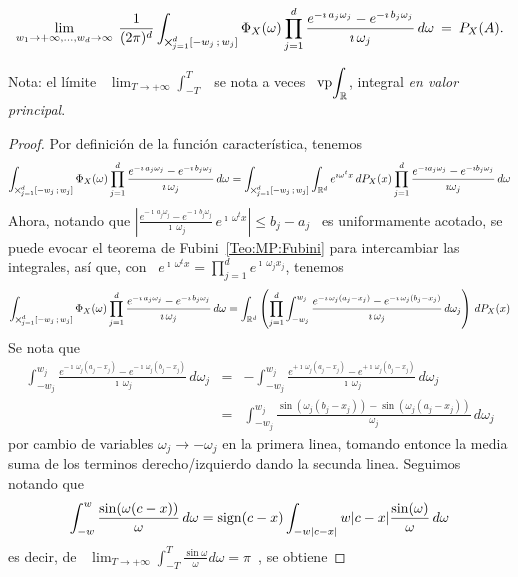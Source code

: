 {\begin{teorema}
  \[
  \lim_{w_1  \to   +\infty,\ldots,  w_d  \to  \infty}   \:  \frac{1}{(2  \pi)^d}
  \int_{\operatorname*{\bigtimes}_{j=1}^d   [-w_j  \, ; \,  w_j]}   \Phi_X(\omega)  \prod_{j   =  1}^d
  \frac{e^{- \imath \,  a_j \omega_j} - e^{- \imath  \, b_j \omega_j}}{\imath \,
    \omega_j} \, d\omega \: = \: P_X(A).
  \]
\end{teorema}
%
Nota: el l\'imite \ $\displaystyle\lim_{T  \to +\infty} \int_{-T}^T$ \ se nota a
veces \ $\displaystyle \operatorname{vp} \!  \int_{\mathbb{R}}$, integral {\it en valor
  principal}.
%
\begin{proof}
  Por definici\'on de la funci\'on caracter\'istica, tenemos
  \[
  \int_{\operatorname*{\bigtimes}_{j=1}^d   [-w_j  \, ; \,  w_j]} \Phi_X(\omega)  \prod_{j = 1}^d  \frac{e^{- \imath  \, a_j
      \omega_j} - e^{- \imath \, b_j \omega_j}}{\imath \, \omega_j} \, d\omega =
  \int_{\operatorname*{\bigtimes}_{j=1}^d   [-w_j  \, ; \,  w_j]} \int_{\mathbb{R}^d} e^{\imath  \omega^t x} \, dP_X(x) \prod_{j =
    1}^d  \frac{e^{- \imath a_j  \omega_j} -  e^{- \imath  b_j \omega_j}}{\imath
    \omega_j} \, d\omega
  \]
  Ahora, notando que $\left| \frac{e^{- \imath \, a_j \omega_j} - e^{- \imath \,
        b_j \omega_j}}{\imath  \, \omega_j} \, e^{\imath \,  \omega^t x} \right|
  \le  b_j - a_j$  \ es  uniformamente acotado,  se puede  evocar el  teorema de
  Fubini~\ref{Teo:MP:Fubini} para intercambiar las  integrales, as\'i que, con \
  $e^{\imath \, \omega^t x} = \prod_{j=1}^d e^{\imath \, \omega_j x_j}$, tenemos
  \[
  \int_{\operatorname*{\bigtimes}_{j=1}^d   [-w_j  \, ; \,  w_j]}   \Phi_X(\omega)  \prod_{j   =  1}^d
  \frac{e^{- \imath \,  a_j \omega_j} - e^{- \imath  \, b_j \omega_j}}{\imath \,
    \omega_j} \, d\omega = \int_{\mathbb{R}^d} \left( \prod_{j=1}^d \int_{-w_j}^{w_j}
    \frac{e^{- \imath \, \omega_j (a_j -  x_j)} - e^{- \imath \, \omega_j (b_j -
        x_j)}}{\imath \, \omega_j} \, d\omega_j \right) \, dP_X(x)
  \]
  Se nota que
  \begin{eqnarray*}
  \int_{-w_j}^{w_j} \frac{e^{- \imath \, \omega_j (a_j - x_j)} - e^{- \imath \, \omega_j
  (b_j - x_j)}}{\imath \, \omega_j} \, d\omega_j & = & - \int_{-w_j}^{w_j} \frac{e^{+
  \imath \, \omega_j (a_j - x_j)} - e^{+ \imath \, \omega_j (b_j - x_j)}}{\imath \,
  \omega_j} \, d\omega_j\\[2mm]
  & = & \int_{-w_j}^{w_j} \frac{\sin(\omega_j (b_j - x_j)) - \sin(\omega_j (a_j -
  x_j))}{\omega_j} \, d\omega_j
  \end{eqnarray*}
  por cambio de variables $\omega_j \to - \omega_j$ en la primera linea, tomando
  entonce  la media  suma de  los  terminos derecho/izquierdo  dando la  secunda
  linea. Seguimos notando que
  \[
  \int_{-w}^w  \frac{\sin(\omega (c  - x))}{\omega}  \, d\omega  = \operatorname{sign}(c  - x)
  \int_{-w |c - x|}{w |c - x|} \frac{\sin(\omega)}{\omega} \, d\omega
  \]
  es  decir, de  \ $\displaystyle  \lim_{T \to  +\infty}  \int_{-T}^T \frac{\sin
    \omega}{\omega} d\omega = \pi$~\cite[Ec.~3.721]{GraRyz15}, se obtiene


\end{proof}}
